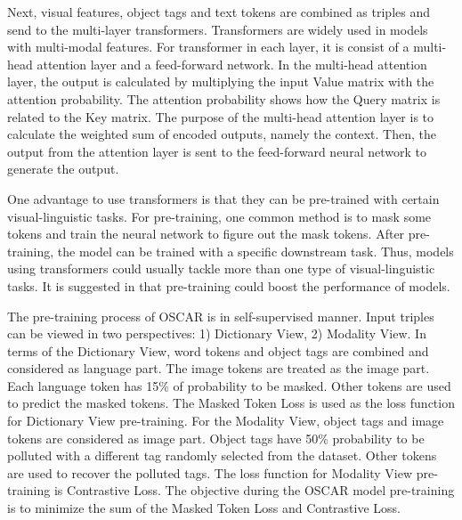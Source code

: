 \documentclass[12pt, a4paper]{article}
\begin{document}
\par\noindent \newline Next, visual features, object tags and text tokens are combined as triples and send to the multi-layer transformers. Transformers are widely used in models with multi-modal features. For transformer \cite{DBLP:journals/corr/VaswaniSPUJGKP17} in each layer, it is consist of a multi-head attention layer and a feed-forward network. In the multi-head attention layer, the output is calculated by multiplying the input Value matrix with the attention probability. The attention probability shows how the Query matrix is related to the Key matrix. The purpose of the multi-head attention layer is to calculate the weighted sum of encoded outputs, namely the context. Then, the output from the attention layer is sent to the feed-forward neural network to generate the output. 

\par\noindent \newline One advantage to use transformers is that they can be pre-trained with certain visual-linguistic tasks. For pre-training, one common method is to mask some tokens and train the neural network to figure out the mask tokens. After pre-training, the model can be trained with a specific downstream task. Thus, models using transformers could usually tackle more than one type of visual-linguistic tasks. It is suggested in \cite{DBLP:journals/corr/abs-2101-11562} that pre-training could boost the performance of models. 

\par\noindent \newline The pre-training process of OSCAR \cite{DBLP:journals/corr/abs-2004-06165} is in self-supervised manner. Input triples can be viewed in two perspectives: 1) Dictionary View, 2) Modality View. In terms of the Dictionary View, word tokens and object tags are combined and considered as language part. The image tokens are treated as the image part. Each language token has 15\% of probability to be masked. Other tokens are used to predict the masked tokens. The Masked Token Loss is used as the loss function for Dictionary View pre-training. For the Modality View, object tags and image tokens are considered as image part. Object tags have 50\% probability to be polluted with a different tag randomly selected from the dataset. Other tokens are used to recover the polluted tags. The loss function for Modality View pre-training is Contrastive Loss. The objective during the OSCAR model pre-training is to minimize the sum of the Masked Token Loss and Contrastive Loss.
\end{document}
